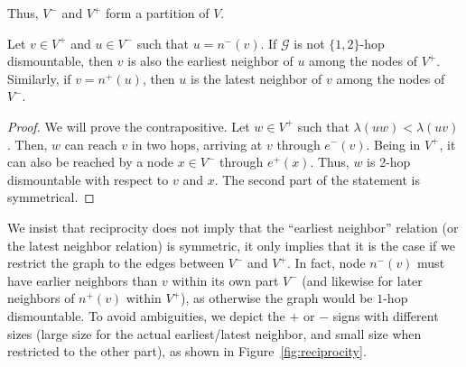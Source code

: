 \documentclass[USenglish, a4paper, thm-restate,numberwithinsect, cleveref]{lipics-v2021}
\newcommand{\G}{\ensuremath{\mathcal{G}}\xspace}
\begin{document}

Thus, $V^-$ and $V^+$ form a partition of $V$.

\begin{lemma}[Reciprocity]\label{cor:reciprocity}
    Let $v\in V^+$ and $u\in V^-$ such that $u=n^-(v)$. If $\G$ is not $\{1,2\}$-hop dismountable, then $v$ is also the earliest neighbor of $u$ among the nodes of $V^+$.
    Similarly, if $v=n^+(u)$, then $u$ is the latest neighbor of $v$ among the nodes of $V^-$.
\end{lemma}

\begin{proof}
  We will prove the contrapositive. Let $w \in V^+$ such that $\lambda(uw)<\lambda(uv)$. Then, $w$ can reach $v$ in two hops, arriving at $v$ through $e^-(v)$. Being in $V^+$, it can also be reached by a node $x\in V^-$ through $e^+(x)$. Thus, $w$ is 2-hop dismountable with respect to $v$ and $x$. The second part of the statement is symmetrical.
\end{proof}

We insist that reciprocity does not imply that the ``earliest neighbor'' relation (or the latest neighbor relation) is symmetric, it only implies that it is the case if we restrict the graph to the edges between $V^-$ and $V^+$. In fact, node $n^-(v)$ must have earlier neighbors than $v$ within its own part $V^-$ (and likewise for later neighbors of $n^+(v)$ within $V^+$), as otherwise the graph would be $1$-hop dismountable. To avoid ambiguities, we depict the $+$ or $-$ signs with different sizes (large size for the actual earliest/latest neighbor, and small size when restricted to the other part), as shown in Figure~\ref{fig:reciprocity}.
\end{document}
